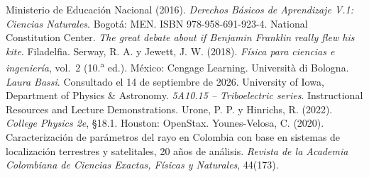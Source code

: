 \documentclass[11pt]{article}
\begin{document}
\begin{referencias}
 Ministerio de Educación Nacional (2016). \emph{Derechos
  Básicos de Aprendizaje V.1: Ciencias Naturales}. Bogotá: MEN.
  ISBN 978-958-691-923-4.
 National Constitution Center. \emph{The great debate
  about if Benjamin Franklin really flew his kite}. Filadelfia.
 Serway, R. A. y Jewett, J. W. (2018). \emph{Física para
  ciencias e ingeniería}, vol.~2 (10.\textsuperscript{a} ed.). México:
  Cengage Learning.
 Università di Bologna. \emph{Laura Bassi}. Consultado el 14 de
  septiembre de 2026.
 University of Iowa, Department of Physics \& Astronomy.
  \emph{5A10.15 -- Triboelectric series}. Instructional Resources and Lecture
  Demonstrations.
 Urone, P. P. y Hinrichs, R. (2022). \emph{College
  Physics 2e}, §18.1. Houston: OpenStax.
 Younes-Velosa, C. (2020). Caracterización de parámetros
  del rayo en Colombia con base en sistemas de localización terrestres y
  satelitales, 20 años de análisis. \emph{Revista de la Academia Colombiana de
  Ciencias Exactas, Físicas y Naturales}, 44(173).
\end{referencias}
\end{document}

